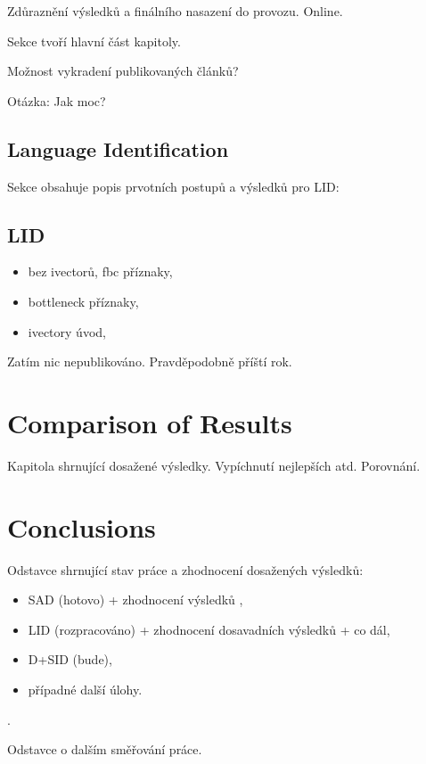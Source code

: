 \documentclass[FM,noheader,EN]{tulthesis}
\begin{document}
Zdůraznění výsledků a finálního nasazení do provozu. Online.

Sekce tvoří hlavní část kapitoly.

Možnost vykradení publikovaných článků?

Otázka: Jak moc?

\section{Language Identification}
\label{ch:solution:lid}
Sekce obsahuje popis prvotních postupů a výsledků pro LID:
\section{LID}
\begin{itemize}
	\item bez ivectorů, fbc příznaky, 
	\item bottleneck příznaky,
	\item ivectory úvod,
\end{itemize}	

Zatím nic nepublikováno. Pravděpodobně příští rok.


\chapter{Comparison of Results}
\label{ch:comparison}
Kapitola shrnující dosažené výsledky. Vypíchnutí nejlepších atd. Porovnání.


\chapter{Conclusions}
Odstavce shrnující stav práce a zhodnocení dosažených výsledků:
\begin{itemize}
	\item SAD (hotovo) + zhodnocení výsledků \cite{SIGMAP16} \cite{ICASSP17} \cite{SPRINGER17}, 
	\item LID (rozpracováno) + zhodnocení dosavadních výsledků + co dál,
	\item D+SID (bude),
	\item případné další úlohy.
\end{itemize}	

.

Odstavce o dalším směřování práce.

\end{document}
